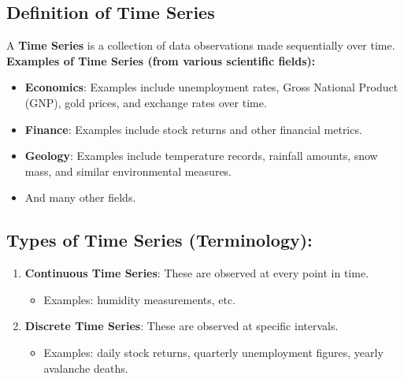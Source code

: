 


\subsection{Definition of Time Series}

A \textbf{Time Series} is a collection of data observations made sequentially over time.\\

\textbf{Examples of Time Series (from various scientific fields):}
\begin{itemize}
    \item \textbf{Economics}: Examples include unemployment rates, Gross National Product (GNP), gold prices, and exchange rates over time.
    \item \textbf{Finance}: Examples include stock returns and other financial metrics.
    \item \textbf{Geology}: Examples include temperature records, rainfall amounts, snow mass, and similar environmental measures.
    \item And many other fields.
\end{itemize}

\subsection{Types of Time Series (Terminology):}
\begin{enumerate}
    \item \textbf{Continuous Time Series}: These are observed at every point in time.
    \begin{itemize}
        \item Examples: humidity measurements, etc.
    \end{itemize}
    \item \textbf{Discrete Time Series}: These are observed at specific intervals.
    \begin{itemize}
        \item Examples: daily stock returns, quarterly unemployment figures, yearly avalanche deaths.
    \end{itemize}
\end{enumerate}

